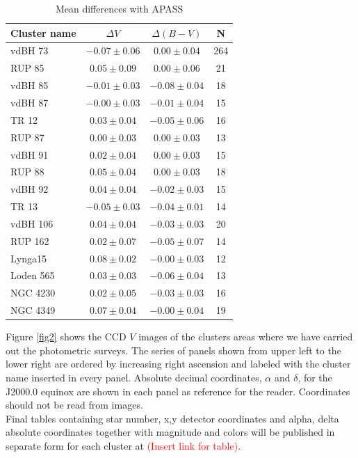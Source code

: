 \documentclass[draft]{aa}
\begin{document}
\begin{table}[ht]
    \centering
    \begin{tabular}{lccc}
    \hline
    Cluster name & $\Delta V$ & $\Delta (B-V)$ & N \\
    \hline \hline
    vdBH 73 & $-0.07\pm0.06$ & $0.00\pm0.04$ & 264\\
    RUP 85 & $0.05\pm0.09$ & $0.00\pm0.06$ & 21\\
    vdBH 85 & $-0.01\pm0.03$ & $-0.08\pm0.04$ & 18\\
    vdBH 87 & $-0.00\pm0.03$ & $-0.01\pm0.04$ & 15\\
    TR 12 & $0.03\pm0.04$ & $-0.05\pm0.06$ & 16\\
    RUP 87 & $0.00\pm0.03$ & $0.00\pm0.03$ & 13\\
    vdBH 91 & $0.02\pm0.04$ & $0.00\pm0.03$ & 15\\
    RUP 88 & $0.05\pm0.04$ & $0.00\pm0.03$ & 18\\
    vdBH 92 & $0.04\pm0.04$ & $-0.02\pm0.03$ & 15\\
    TR 13 & $-0.05\pm0.03$ & $-0.04\pm0.01$ & 14\\
    vdBH 106 & $0.04\pm0.04$ & $-0.03\pm0.03$ & 20\\
    RUP 162 & $0.02\pm0.07$ & $-0.05\pm0.07$ & 14\\
    Lynga15 & $0.08\pm0.02$ & $-0.00\pm0.03$ & 12\\
    Loden 565 & $0.03\pm0.03$ & $-0.06\pm0.04$ & 13\\
    NGC 4230 & $0.02\pm0.05$ & $-0.03\pm0.03$ & 16\\
    NGC 4349 & $0.07\pm0.04$ & $-0.00\pm0.04$ & 19\\
    \hline
    \end{tabular}
    \caption{Mean differences with APASS}
    \label{tab:apass_diffs}
\end{table}

Figure \ref{fig2} shows the CCD $V$ images of the clusters areas where we have
carried out the photometric surveys. The series of panels shown from upper left
to the lower right are ordered by increasing right ascension and labeled with
the cluster name inserted in every panel. Absolute decimal
coordinates, $\alpha$ and $\delta$, for the J2000.0 equinox are shown in each
panel as reference for the reader. Coordinates should not be read from
images.\\

Final tables containing star number, x,y detector coordinates and alpha,
delta absolute coordinates together with magnitude and colors will be published
in separate form for each cluster at \textcolor{red}{(Insert link for table)}.
\end{document}
